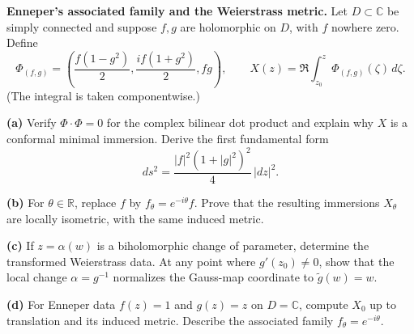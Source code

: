 \begin{problem}[CP-IV-0084]
\label{prob:cp-iv-0084}
\textbf{Enneper's associated family and the Weierstrass metric.}
Let $D\subset\mathbb C$ be simply connected and suppose $f,g$ are holomorphic
on $D$, with $f$ nowhere zero. Define
\[
\Phi_{(f,g)}=\left(\frac{f(1-g^2)}2,\frac{if(1+g^2)}2,fg\right),
\qquad X(z)=\Re\int_{z_0}^{z}\Phi_{(f,g)}(\zeta)\,d\zeta.
\]
(The integral is taken componentwise.)

\par\noindent\textbf{(a)} Verify $\Phi\cdot\Phi=0$ for the complex bilinear dot
product and explain why $X$ is a conformal minimal immersion. Derive the
first fundamental form
\[
 ds^2=\frac{|f|^2(1+|g|^2)^2}{4}\,|dz|^2.
\]

\par\noindent\textbf{(b)} For $\theta\in\mathbb R$, replace $f$ by
$f_\theta=e^{-i\theta}f$. Prove that the resulting immersions $X_\theta$
are locally isometric, with the same induced metric.

\par\noindent\textbf{(c)} If $z=\alpha(w)$ is a biholomorphic change of
parameter, determine the transformed Weierstrass data. At any point where
$g'(z_0)\neq0$, show that the local change $\alpha=g^{-1}$ normalizes the
Gauss-map coordinate to $\widetilde g(w)=w$.

\par\noindent\textbf{(d)} For Enneper data $f(z)=1$ and $g(z)=z$ on
$D=\mathbb C$, compute $X_0$ up to translation and its induced metric.
Describe the associated family $f_\theta=e^{-i\theta}$.
\end{problem}



